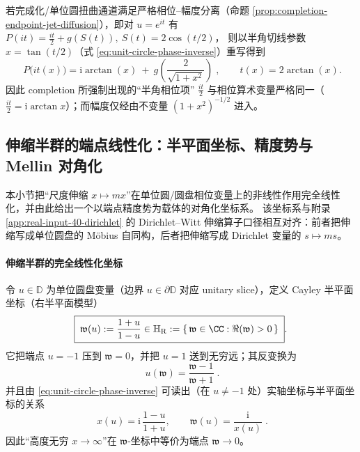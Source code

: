 \begin{remark}\label{rem:unit-circle-phase-completion-half-angle}
若完成化/单位圆扭曲通道满足严格相位--幅度分离（命题 \ref{prop:completion-endpoint-jet-diffusion}），即对 \(u=e^{it}\) 有
\(
P(it)=\frac{it}{2}+g(S(t)),\ S(t)=2\cos(t/2)
\)，
则以半角切线参数 \(x=\tan(t/2)\)（式 \eqref{eq:unit-circle-phase-inverse}）重写得到
\[
\boxed{\;
P\!\bigl(it(x)\bigr)
=\mathrm{i}\arctan(x)\ +\ g\!\left(\frac{2}{\sqrt{1+x^2}}\right)\;},
\qquad t(x)=2\arctan(x).
\]
因此 completion 所强制出现的“半角相位项” \(\frac{it}{2}\) 与相位算术变量严格同一（\(\frac{it}{2}=\mathrm{i}\arctan x\)）；而幅度仅经由不变量 \((1+x^2)^{-1/2}\) 进入。
\end{remark}

\subsection{伸缩半群的端点线性化：半平面坐标、精度势与 Mellin 对角化}\label{subsec:unit-circle-scale-linearization}
本小节把“尺度伸缩 \(x\mapsto mx\)”在单位圆/圆盘相位变量上的非线性作用完全线性化，并由此给出一个以端点精度势为载体的对角化坐标系。
该坐标系与附录 \ref{app:real-input-40-dirichlet} 的 Dirichlet--Witt 伸缩算子口径相互对齐：前者把伸缩写成单位圆盘的 Möbius 自同构，后者把伸缩写成 Dirichlet 变量的 \(s\mapsto ms\)。

\paragraph{伸缩半群的完全线性化坐标}
令 \(u\in\mathbb{D}\) 为单位圆盘变量（边界 \(u\in\partial\mathbb{D}\) 对应 unitary slice），定义 Cayley 半平面坐标（右半平面模型）
\begin{equation}\label{eq:scale-linearization-halfplane-coordinate}
\boxed{\;
\mathfrak{w}(u):=\frac{1+u}{1-u}\in\mathbb{H}_{\mathrm{R}}:=\{\,\mathfrak{w}\in\CC:\Re(\mathfrak{w})>0\,\}\; }.
\end{equation}
它把端点 \(u=-1\) 压到 \(\mathfrak{w}=0\)，并把 \(u=1\) 送到无穷远；其反变换为
\begin{equation}\label{eq:scale-linearization-halfplane-inverse}
\boxed{\;u(\mathfrak{w})=\frac{\mathfrak{w}-1}{\mathfrak{w}+1}\; }.
\end{equation}
并且由 \eqref{eq:unit-circle-phase-inverse} 可读出（在 \(u\neq-1\) 处）实轴坐标与半平面坐标的关系
\begin{equation}\label{eq:scale-linearization-w-vs-x}
\boxed{\;
x(u)=\mathrm{i}\,\frac{1-u}{1+u},
\qquad
\mathfrak{w}(u)=\frac{\mathrm{i}}{x(u)}\; }.
\end{equation}
因此“高度无穷 \(x\to\infty\)”在 \(\mathfrak{w}\)-坐标中等价为端点 \(\mathfrak{w}\to 0\)。

